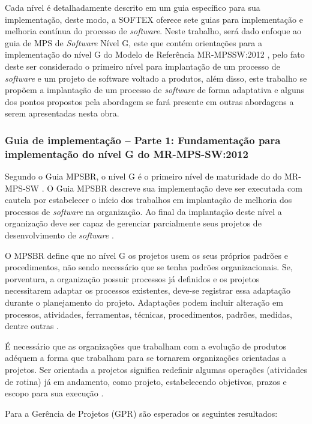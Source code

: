 \documentclass{acm_proc_article-sp}
\begin{document}
Cada nível é detalhadamente descrito em um guia específico para sua implementação, deste modo, a SOFTEX oferece sete guias para implementação e melhoria contínua do processo de \textit{software}. Neste trabalho, será dado enfoque ao guia de MPS de \textit{Software} Nível G, este que contém orientações para a implementação do nível G do Modelo de Referência MR-MPSSW:2012  \cite{mpsbr:nAgil}, pelo fato deste ser considerado o primeiro nível para implantação de um processo de \textit{software} e um projeto de software voltado a produtos, além disso, este trabalho se propõem a implantação de um processo de \textit{software} de forma adaptativa e alguns dos pontos propostos pela abordagem se fará presente em outras abordagens a serem apresentadas nesta obra.  

\subsubsection*{Guia de implementação – Parte 1: Fundamentação para implementação do nível G do MR-MPS-SW:2012}
Segundo o Guia MPSBR, o nível G é o primeiro nível de maturidade do do MR-MPS-SW \cite{mpsbr:nAgil}. O Guia MPSBR descreve sua implementação deve ser executada com cautela por estabelecer o início dos trabalhos em implantação de melhoria dos processos de \textit{software} na organização. Ao final da implantação deste nível a organização deve ser capaz de gerenciar parcialmente seus projetos de desenvolvimento de \textit{software} \cite{mpsbr:nAgil}.

O MPSBR define que no nível G os projetos usem os seus próprios padrões e procedimentos, não
sendo necessário que se tenha padrões organizacionais. Se, porventura, a organização possuir processos já definidos e os projetos necessitarem adaptar os processos existentes, deve-se registrar essa adaptação durante o planejamento do projeto. Adaptações podem incluir alteração em processos, atividades, ferramentas, técnicas, procedimentos, padrões, medidas, dentre outras \cite{mpsbr:nAgil}.

É necessário que as organizações que trabalham com a evolução de produtos adéquem a forma que trabalham para se tornarem organizações orientadas a projetos. Ser orientada a projetos significa redefinir algumas operações (atividades
de rotina) já em andamento, como projeto, estabelecendo objetivos, prazos e escopo
para sua execução \cite{mpsbr:nAgil}.

Para a Gerência de Projetos (GPR) são esperados os seguintes resultados:
\end{document}
